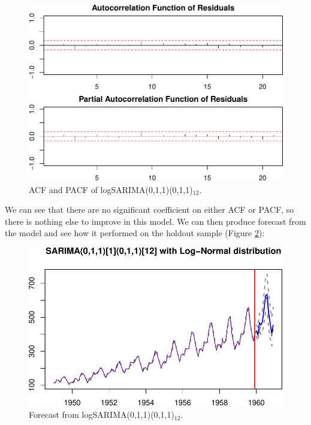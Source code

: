 \documentclass[]{book}
\newenvironment{Shaded}{\begin{snugshade}}{\end{snugshade}}
\newcommand{\DataTypeTok}[1]{\textcolor[rgb]{0.13,0.29,0.53}{#1}}
\newcommand{\DecValTok}[1]{\textcolor[rgb]{0.00,0.00,0.81}{#1}}
\newcommand{\KeywordTok}[1]{\textcolor[rgb]{0.13,0.29,0.53}{\textbf{#1}}}
\newcommand{\NormalTok}[1]{#1}
\newcommand{\OperatorTok}[1]{\textcolor[rgb]{0.81,0.36,0.00}{\textbf{#1}}}
\newcommand{\StringTok}[1]{\textcolor[rgb]{0.31,0.60,0.02}{#1}}
\theoremstyle{definition}
\theoremstyle{definition}
\theoremstyle{definition}
\theoremstyle{definition}
\theoremstyle{remark}
\begin{document}
\begin{figure}
\centering
\includegraphics{Svetunkov--2022----ADAM_files/figure-latex/logSARIMAACF-1.pdf}
\caption{\label{fig:logSARIMAACF}ACF and PACF of logSARIMA(0,1,1)(0,1,1)\(_{12}\).}
\end{figure}

We can see that there are no significant coefficient on either ACF or PACF, so there is nothing else to improve in this model. We can then produce forecast from the model and see how it performed on the holdout sample (Figure \ref{fig:logSARIMAForecast}):

\begin{Shaded}
\end{Shaded}

\begin{figure}
\centering
\includegraphics{Svetunkov--2022----ADAM_files/figure-latex/logSARIMAForecast-1.pdf}
\caption{\label{fig:logSARIMAForecast}Forecast from logSARIMA(0,1,1)(0,1,1)\(_{12}\).}
\end{figure}
\end{document}
